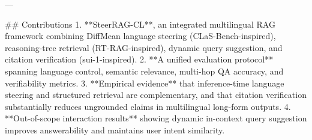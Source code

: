 ---

## Contributions
1. **SteerRAG-CL**, an integrated multilingual RAG framework combining DiffMean language steering (CLaS-Bench-inspired), reasoning-tree retrieval (RT-RAG-inspired), dynamic query suggestion, and citation verification (sui-1-inspired).
2. **A unified evaluation protocol** spanning language control, semantic relevance, multi-hop QA accuracy, and verifiability metrics.
3. **Empirical evidence** that inference-time language steering and structured retrieval are complementary, and that citation verification substantially reduces ungrounded claims in multilingual long-form outputs.
4. **Out-of-scope interaction results** showing dynamic in-context query suggestion improves answerability and maintains user intent similarity.


